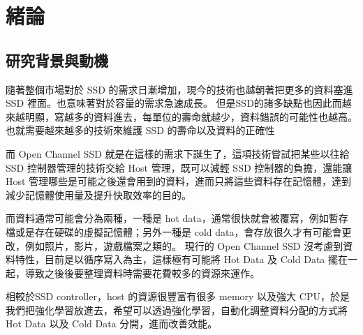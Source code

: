 \chapter{緒論}
\section{研究背景與動機}
\indent
隨著整個市場對於 SSD 的需求日漸增加，現今的技術也越朝著把更多的資料塞進 SSD 裡面。也意味著對於容量的需求急速成長。
但是SSD的諸多缺點也因此而越來越明顯，寫越多的資料進去，每單位的壽命就越少，資料錯誤的可能性也越高。
也就需要越來越多的技術來維護 SSD 的壽命以及資料的正確性

而 Open Channel SSD 就是在這樣的需求下誕生了，這項技術嘗試把某些以往給 SSD 控制器管理的技術交給 Host 管理，既可以減輕 SSD 控制器的負擔，還能讓 Host 管理哪些是可能之後還會用到的資料，進而只將這些資料存在記憶體，達到減少記憶體使用量及提升快取效率的目的。

而資料通常可能會分為兩種，一種是 hot data，通常很快就會被覆寫，例如暫存檔或是存在硬碟的虛擬記憶體；另外一種是 cold data，會存放很久才有可能會更改，例如照片，影片，遊戲檔案之類的。
現行的 Open Channel SSD 沒考慮到資料特性，目前是以循序寫入為主，這樣極有可能將 Hot Data 及 Cold Data 擺在一起，導致之後後要整理資料時需要花費較多的資源來運作。

相較於SSD controller，host 的資源很豐富有很多 memory 以及強大 CPU，於是我們把強化學習放進去，希望可以透過強化學習，自動化調整資料分配的方式將 Hot Data 以及 Cold Data 分開，進而改善效能。



